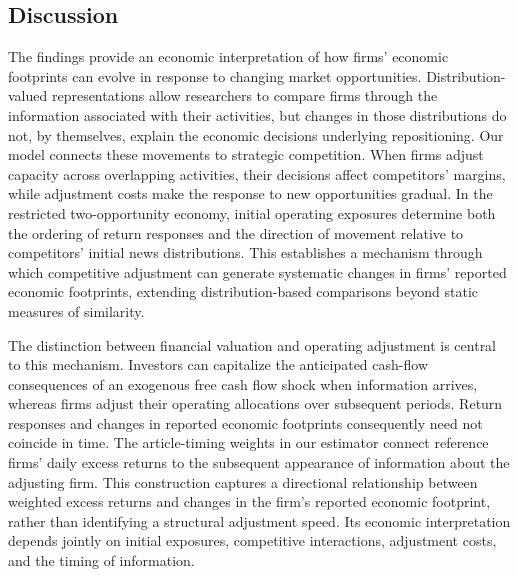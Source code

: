 \subsection{Discussion}\label{sec:discussion}

The findings provide an economic interpretation of how firms' economic
footprints can evolve in response to changing market opportunities.
Distribution-valued representations allow researchers to compare firms
through the information associated with their activities, but changes in
those distributions do not, by themselves, explain the economic decisions
underlying repositioning.
Our model connects these movements to strategic competition.
When firms adjust capacity across overlapping activities, their decisions
affect competitors' margins, while adjustment costs make the response to new
opportunities gradual.
In the restricted two-opportunity economy, initial operating exposures
determine both the ordering of return responses and the direction of
movement relative to competitors' initial news distributions.
This establishes a mechanism through which competitive adjustment can
generate systematic changes in firms' reported economic footprints, extending
distribution-based comparisons beyond static measures of similarity.

The distinction between financial valuation and operating adjustment is
central to this mechanism.
Investors can capitalize the anticipated cash-flow consequences of an
exogenous free cash flow shock when information arrives, whereas firms adjust their
operating allocations over subsequent periods.
Return responses and changes in reported economic footprints consequently need not
coincide in time.
The article-timing weights in our estimator connect reference firms' daily
excess returns to the subsequent appearance of information about the
adjusting firm.
This construction captures a directional relationship between weighted
excess returns and changes in the firm's reported economic footprint, rather
than identifying a structural adjustment speed.
Its economic interpretation depends jointly on initial exposures, competitive
interactions, adjustment costs, and the timing of information.

